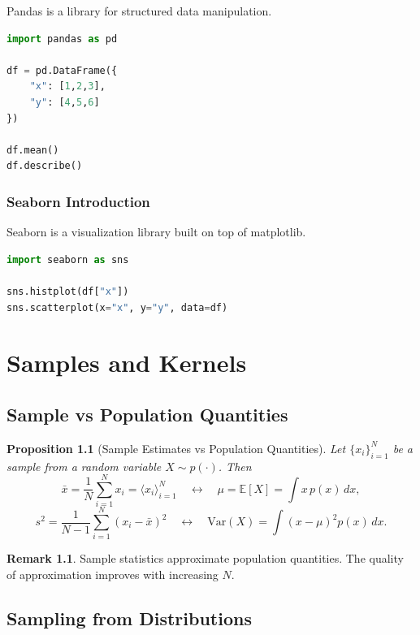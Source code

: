 \documentclass[12pt,oneside]{book}
\numberwithin{equation}{section}
\theoremstyle{definition}
\newtheorem{remark}{Remark}[section]
\theoremstyle{plain}
\newtheorem{proposition}{Proposition}[section]
\theoremstyle{remark}
\newcommand{\E}{\mathbb{E}}
\newcommand{\Var}{\mathrm{Var}}
\begin{document}
Pandas is a library for structured data manipulation.

\begin{lstlisting}[language=Python]
import pandas as pd

df = pd.DataFrame({
    "x": [1,2,3],
    "y": [4,5,6]
})

df.mean()
df.describe()
\end{lstlisting}

\subsection{Seaborn Introduction}

Seaborn is a visualization library built on top of matplotlib.

\begin{lstlisting}[language=Python]
import seaborn as sns

sns.histplot(df["x"])
sns.scatterplot(x="x", y="y", data=df)
\end{lstlisting}

\chapter{Samples and Kernels}

\section{Sample vs Population Quantities}

\begin{proposition}[Sample Estimates vs Population Quantities]
Let $\{x_i\}_{i=1}^N$ be a sample from a random variable $X \sim p(\cdot)$. Then
\[
\bar{x} = \frac{1}{N}\sum_{i=1}^N x_i = \langle x_i \rangle_{i=1}^N
\quad \longleftrightarrow \quad
\mu = \E[X] = \int x\,p(x)\,dx,
\]
\[
s^2 = \frac{1}{N-1}\sum_{i=1}^N (x_i - \bar{x})^2
\quad \longleftrightarrow \quad
\Var(X) = \int (x-\mu)^2 p(x)\,dx.
\]
\end{proposition}

\begin{remark}
Sample statistics approximate population quantities. The quality of approximation improves with increasing $N$.
\end{remark}

\section{Sampling from Distributions}
\end{document}
